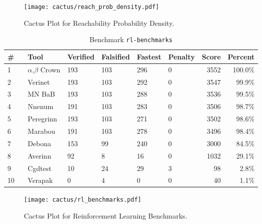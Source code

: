 \begin{figure}[h]
\centerline{\texttt{[image: cactus/reach\_prob\_density.pdf]}}
\caption{Cactus Plot for Reachability Probability Density.}
\label{fig:quantPic}
\end{figure}



\begin{table}[h]
\begin{center}
\caption{Benchmark \texttt{rl-benchmarks}} \label{tab:cat_{cat}}
{\setlength{\tabcolsep}{2pt}
\begin{tabular}[h]{@{}llllllrr@{}}
\toprule
\textbf{\# ~} & \textbf{Tool} & \textbf{Verified} & \textbf{Falsified} & \textbf{Fastest} & \textbf{Penalty} & \textbf{Score} & \textbf{Percent}\\
\midrule
1 & $\alpha$,$\beta$ Crown & 193 & 103 & 296 & 0 & 3552 & 100.0\% \\
2 & Verinet & 193 & 103 & 292 & 0 & 3547 & 99.9\% \\
3 & MN BaB & 193 & 103 & 288 & 0 & 3536 & 99.5\% \\
4 & Nnenum & 191 & 103 & 283 & 0 & 3506 & 98.7\% \\
5 & Peregrinn & 193 & 103 & 271 & 0 & 3502 & 98.6\% \\
6 & Marabou & 191 & 103 & 278 & 0 & 3496 & 98.4\% \\
7 & Debona & 153 & 99 & 240 & 0 & 3000 & 84.5\% \\
8 & Averinn & 92 & 8 & 16 & 0 & 1032 & 29.1\% \\
9 & Cgdtest & 10 & 24 & 29 & 3 & 98 & 2.8\% \\
10 & Verapak & 0 & 4 & 0 & 0 & 40 & 1.1\% \\
\bottomrule
\end{tabular}
}
\end{center}
\end{table}



\begin{figure}[h]
\centerline{\texttt{[image: cactus/rl\_benchmarks.pdf]}}
\caption{Cactus Plot for Reinforcement Learning Benchmarks.}
\label{fig:quantPic}
\end{figure}



